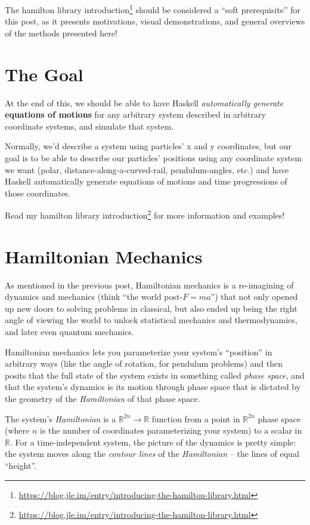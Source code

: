 \documentclass[]{article}
\renewcommand{\href}[2]{#2\footnote{\url{#1}}}
\begin{document}
The
\href{https://blog.jle.im/entry/introducing-the-hamilton-library.html}{hamilton
library introduction} should be considered a ``soft prerequisite'' for this
post, as it presents motivations, visual demonstrations, and general overviews
of the methods presented here!

\section{The Goal}\label{the-goal}

At the end of this, we should be able to have Haskell \emph{automatically
generate} \textbf{equations of motions} for any arbitrary system described in
arbitrary coordinate systems, and simulate that system.

Normally, we'd describe a system using particles' x and y coordinates, but our
goal is to be able to describe our particles' positions using any coordinate
system we want (polar, distance-along-a-curved-rail, pendulum-angles, etc.) and
have Haskell automatically generate equations of motions and time progressions
of those coordinates.

Read \href{https://blog.jle.im/entry/introducing-the-hamilton-library.html}{my
hamilton library introduction} for more information and examples!

\section{Hamiltonian Mechanics}\label{hamiltonian-mechanics}

As mentioned in the previous post, Hamiltonian mechanics is a re-imagining of
dynamics and mechanics (think ``the world post-\(F = m a\)'') that not only
opened up new doors to solving problems in classical, but also ended up being
the right angle of viewing the world to unlock statistical mechanics and
thermodynamics, and later even quantum mechanics.

Hamiltonian mechanics lets you parameterize your system's ``position'' in
arbitrary ways (like the angle of rotation, for pendulum problems) and then
posits that the full state of the system exists in something called \emph{phase
space}, and that the system's dynamics is its motion through phase space that is
dictated by the geometry of the \emph{Hamiltonian} of that phase space.

The system's \emph{Hamiltonian} is a \(\mathbb{R}^{2n} \rightarrow \mathbb{R}\)
function from a point in \(\mathbb{R}^{2n}\) phase space (where \(n\) is the
number of coordinates parameterizing your system) to a scalar in \(\mathbb{R}\).
For a time-independent system, the picture of the dynamics is pretty simple: the
system moves along the \emph{contour lines} of the \emph{Hamiltonian} -- the
lines of equal ``height''.
\end{document}
